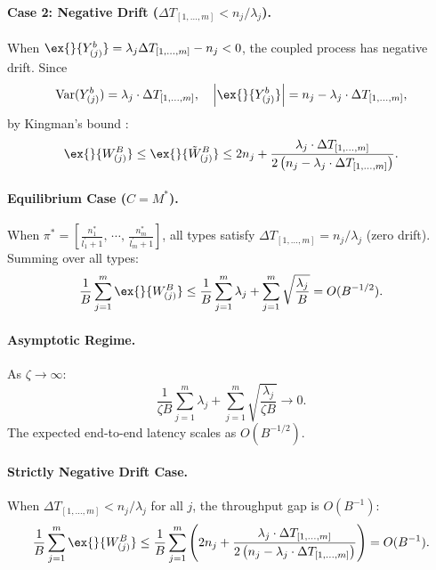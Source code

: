 \paragraph{Case 2: Negative Drift ($\Delta T_{[1,\ldots,m]} < n_j/\lambda_j$).} When $\ex{}{Y^b_{(j)}}= \lambda_j \Delta T_{[1,\ldots,m]} - n_j <0$, the coupled process has negative drift. Since
$$\text{Var}(Y^b_{(j)}) = \lambda_j \cdot \Delta T_{[1,\ldots,m]},\quad
\left| \ex{}{Y^b_{(j)}} \right| = n_j - \lambda_j\cdot \Delta T_{[1,\ldots,m]},$$
by Kingman's bound \citep{kingman1962queues}:
$$\ex{}{W^B_{(j)}}\leq \ex{}{\tilde{W}^B_{(j)}}\leq 2n_j+ \frac{\lambda_j \cdot \Delta T_{[1,\ldots,m]}}{2\left(n_j - \lambda_j\cdot \Delta T_{[1,\ldots,m]}\right)}.$$

\paragraph{Equilibrium Case ($C = M^*$).} When $\pi^* = [\frac{n_1^*}{l_1^\prime+1},\,\cdots,\, \frac{n_m^*}{l_m^\prime+1}]$, all types satisfy $\Delta T_{[1,\ldots,m]} = n_j/\lambda_j$ (zero drift). Summing over all types:
$$\frac{1}{B}\sum_{j=1}^m \ex{}{W^B_{(j)}}\leq \frac{1}{B}\sum_{j=1}^m \lambda_j +\sum_{j=1}^m \sqrt{\frac{\lambda_j}{B}} = O(B^{-1/2}).$$

\paragraph{Asymptotic Regime.} As $\zeta \to \infty$:
$$\frac{1}{\zeta B}\sum_{j=1}^m \lambda_j +\sum_{j=1}^m \sqrt{\frac{\lambda_j}{\zeta B}} \to 0.$$
The expected end-to-end latency scales as $O(B^{-1/2})$.

\paragraph{Strictly Negative Drift Case.} When $\Delta T_{[1,\ldots,m]} < n_j/\lambda_j$ for all $j$, the throughput gap is $O(B^{-1})$:
$$\frac{1}{B}\sum_{j=1}^m \ex{}{W^B_{(j)}}\leq \frac{1}{B}  \sum_{j=1}^m \left(2n_j+ \frac{\lambda_j \cdot \Delta T_{[1,\ldots,m]}}{2\left(n_j - \lambda_j\cdot \Delta T_{[1,\ldots,m]}\right)}\right) = O(B^{-1}).$$
